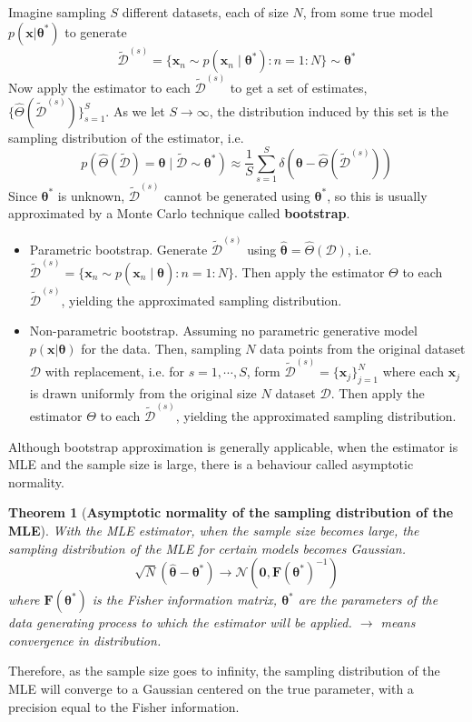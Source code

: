 \documentclass[11pt]{article}
\newtheorem{theorem}{Theorem}
\begin{document}
Imagine sampling $S$ different datasets, each of size $N$, from some true model $p(\boldsymbol{x} | \boldsymbol{\theta}^*)$ to generate
\[
\tilde{\mathcal{D}}^{(s)} = \{\boldsymbol{x}_n \sim p(\boldsymbol{x}_n \mid \boldsymbol{\theta}^*) : n = 1:N\} \sim \boldsymbol{\theta}^*
\]
Now apply the estimator to each $\tilde{\mathcal{D}}^{(s)}$ to get a set of estimates, $\{\hat{\Theta}(\tilde{\mathcal{D}}^{(s)})\}_{s=1}^{S}$. As we let $S \to \infty$, the distribution induced by this set is the sampling distribution of the estimator, i.e.
\[
p(\hat{\Theta}(\tilde{\mathcal{D}}) = \boldsymbol{\theta} \mid \tilde{\mathcal{D}} \sim \boldsymbol{\theta}^*) \approx \frac{1}{S} \sum_{s=1}^{S} \delta(\boldsymbol{\theta} - \hat{\Theta}(\tilde{\mathcal{D}}^{(s)}))
\]
Since $\boldsymbol{\theta}^*$ is unknown, $\tilde{\mathcal{D}}^{(s)}$ cannot be generated using $\boldsymbol{\theta}^*$, so this is usually approximated by a Monte Carlo technique called \textbf{bootstrap}.
\begin{itemize}
    \item Parametric bootstrap. Generate $\tilde{\mathcal{D}}^{(s)}$ using $\hat{\boldsymbol{\theta}} = \hat{\Theta}(\mathcal{D})$, i.e. $\tilde{\mathcal{D}}^{(s)} = \{\boldsymbol{x}_n \sim p(\boldsymbol{x}_n \mid \hat{\boldsymbol{\theta}}) : n = 1:N\}$.
    Then apply the estimator $\Theta$ to each $\tilde{\mathcal{D}}^{(s)}$, yielding the approximated sampling distribution.
    \item Non-parametric bootstrap. Assuming no parametric generative model $p(\boldsymbol{x} | \boldsymbol{\theta})$ for the data. Then, sampling $N$ data points from the original dataset $\mathcal{D}$ with replacement, i.e. for $s = 1, \cdots, S$, form $\tilde{\mathcal{D}}^{(s)} = \{\boldsymbol{x}_j \}_{j=1}^N$ where each $\boldsymbol{x}_j$ is drawn uniformly from the original size $N$ dataset $\mathcal{D}$.
    Then apply the estimator $\Theta$ to each $\tilde{\mathcal{D}}^{(s)}$, yielding the approximated sampling distribution.
\end{itemize}

Although bootstrap approximation is generally applicable, when the estimator is MLE and the sample size is large, there is a behaviour called asymptotic normality.
\begin{theorem}[\textbf{Asymptotic normality of the sampling distribution of the MLE}]
With the MLE estimator, when the sample size becomes large, the sampling distribution of the MLE for certain models becomes Gaussian.
\[
\sqrt{N}(\hat{\boldsymbol{\theta}} - \boldsymbol{\theta}^*) \to \mathcal{N}(\boldsymbol{0}, \mathbf{F}(\boldsymbol{\theta}^*)^{-1})
\]
where $\mathbf{F}(\boldsymbol{\theta}^*)$ is the Fisher information matrix, $\boldsymbol{\theta}^*$ are the parameters of the data generating process to which the estimator will be applied.
$\to$ means convergence in distribution.
\end{theorem}
Therefore, as the sample size goes to infinity, the sampling distribution of the MLE will converge to a Gaussian centered on the true parameter, 
with a precision equal to the Fisher information.
\end{document}
